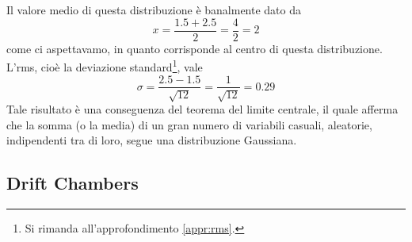 Il valore medio di questa distribuzione è banalmente dato da
\begin{equation*}
   x
   =\frac{1.5 + 2.5}{2}
   =\frac{4}{2}
   =2
\end{equation*}
come ci aspettavamo, in quanto corrisponde al centro di questa distribuzione. L'rms, cioè la deviazione standard\footnote{Si rimanda all'approfondimento \ref{appr:rms}.}, vale
\begin{equation*}
   \sigma
   =\frac{2.5 - 1.5}{\sqrt{12}}
   =\frac{1}{\sqrt{12}}
   =0.29
\end{equation*}
Tale risultato è una conseguenza del teorema del limite centrale, il quale afferma che la somma (o la media) di un gran numero di variabili casuali, aleatorie, indipendenti tra di loro, segue una distribuzione Gaussiana.

\subsection{Drift Chambers}

